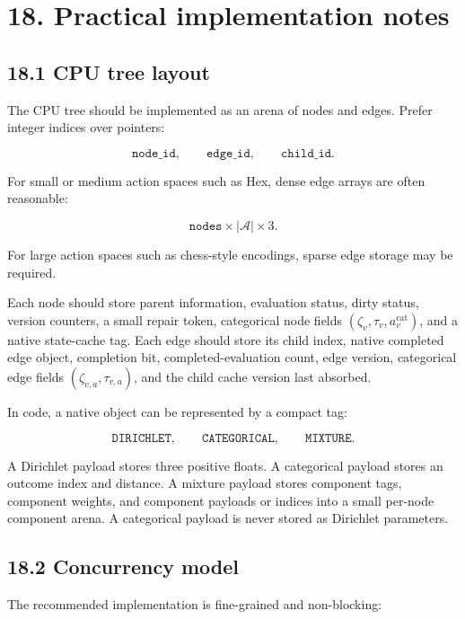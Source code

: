 \documentclass[11pt]{article}
\newcommand{\Actions}{\mathcal{A}}
\begin{document}
\section*{18. Practical implementation notes}

\subsection*{18.1 CPU tree layout}

The CPU tree should be implemented as an arena of nodes and edges. Prefer
integer indices over pointers:

\[
\texttt{node\_id},
\qquad
\texttt{edge\_id},
\qquad
\texttt{child\_id}.
\]

For small or medium action spaces such as Hex, dense edge arrays are often
reasonable:

\[
\texttt{nodes} \times |\Actions| \times 3.
\]

For large action spaces such as chess-style encodings, sparse edge storage may
be required.

Each node should store parent information, evaluation status, dirty status,
version counters, a small repair token, categorical node fields
\((\zeta_v,\tau_v,a_v^{\mathrm{cat}})\), and a native state-cache tag. Each edge
should store its child index, native completed edge object, completion bit,
completed-evaluation count, edge version, categorical edge fields
\((\zeta_{v,a},\tau_{v,a})\), and the child cache version last absorbed.

In code, a native object can be represented by a compact tag:

\[
\texttt{DIRICHLET},
\qquad
\texttt{CATEGORICAL},
\qquad
\texttt{MIXTURE}.
\]

A Dirichlet payload stores three positive floats. A categorical payload stores
an outcome index and distance. A mixture payload stores component tags, component
weights, and component payloads or indices into a small per-node component
arena. A categorical payload is never stored as Dirichlet parameters.

\subsection*{18.2 Concurrency model}

The recommended implementation is fine-grained and non-blocking:
\end{document}
